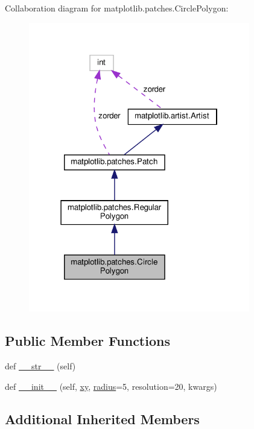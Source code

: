 Collaboration diagram for matplotlib.\+patches.\+Circle\+Polygon\+:
\nopagebreak
\begin{figure}[H]
\begin{center}
\leavevmode
\includegraphics[width=274pt]{classmatplotlib_1_1patches_1_1CirclePolygon__coll__graph}
\end{center}
\end{figure}
\subsection*{Public Member Functions}
\begin{DoxyCompactItemize}
\item 
def \hyperlink{classmatplotlib_1_1patches_1_1CirclePolygon_a027ee5ae8287e8b779413286229caf3c}{\+\_\+\+\_\+str\+\_\+\+\_\+} (self)
\item 
def \hyperlink{classmatplotlib_1_1patches_1_1CirclePolygon_a399b335c9f107df89b35136c41ae9189}{\+\_\+\+\_\+init\+\_\+\+\_\+} (self, \hyperlink{classmatplotlib_1_1patches_1_1RegularPolygon_a504bd1bf9e94da2e1b2a55bd9d6b754c}{xy}, \hyperlink{classmatplotlib_1_1patches_1_1RegularPolygon_a3231c25ddcc48b1fa87581e63a29f188}{radius}=5, resolution=20, kwargs)
\end{DoxyCompactItemize}
\subsection*{Additional Inherited Members}


